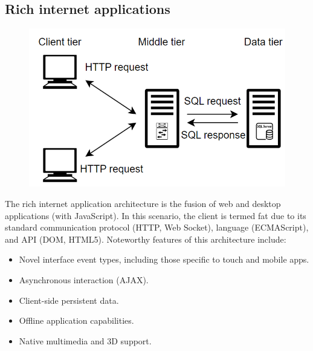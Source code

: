 \subsection{Rich internet applications}
\begin{figure}[H]
    \centering
    \includegraphics[width=0.35\linewidth]{images/ttph.png}
\end{figure}
The rich internet application architecture is the fusion of web and desktop applications (with JavaScript). 
In this scenario, the client is termed fat due to its standard communication protocol (HTTP, Web Socket), language (ECMAScript), and API (DOM, HTML5). 
Noteworthy features of this architecture include:
\begin{itemize}
    \item Novel interface event types, including those specific to touch and mobile apps.
    \item Asynchronous interaction (AJAX).
    \item Client-side persistent data.
    \item Offline application capabilities.
    \item Native multimedia and 3D support.
\end{itemize}